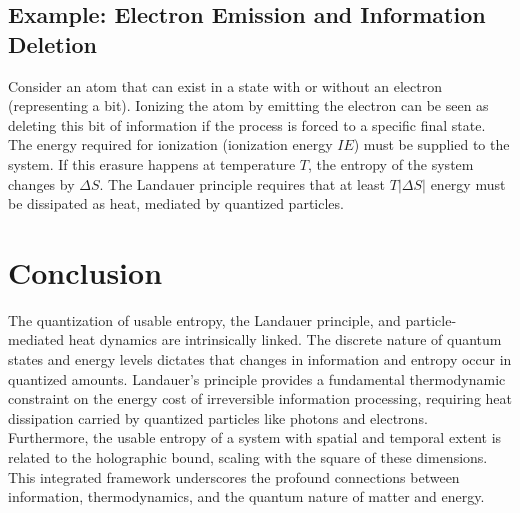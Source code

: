 		\subsection{Example: Electron Emission and Information Deletion}
		Consider an atom that can exist in a state with or without an electron (representing a bit). Ionizing the atom by emitting the electron can be seen as deleting this bit of information if the process is forced to a specific final state. The energy required for ionization (ionization energy $IE$) must be supplied to the system. If this erasure happens at temperature $T$, the entropy of the system changes by $\Delta S$. The Landauer principle requires that at least $T |\Delta S|$ energy must be dissipated as heat, mediated by quantized particles.
		
		\section{Conclusion}
		The quantization of usable entropy, the Landauer principle, and particle-mediated heat dynamics are intrinsically linked. The discrete nature of quantum states and energy levels dictates that changes in information and entropy occur in quantized amounts. Landauer's principle provides a fundamental thermodynamic constraint on the energy cost of irreversible information processing, requiring heat dissipation carried by quantized particles like photons and electrons. Furthermore, the usable entropy of a system with spatial and temporal extent is related to the holographic bound, scaling with the square of these dimensions. This integrated framework underscores the profound connections between information, thermodynamics, and the quantum nature of matter and energy.
		
